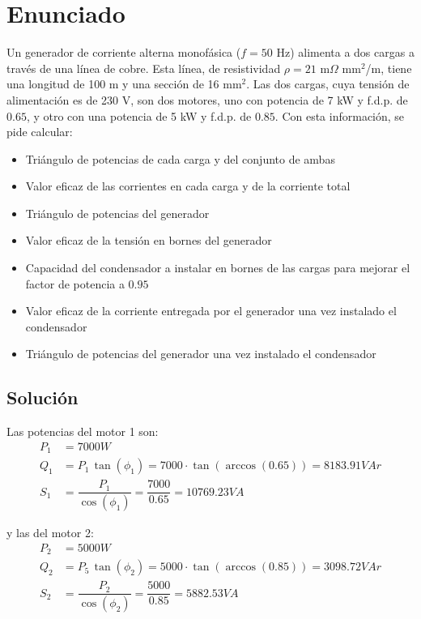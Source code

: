 
\section{Enunciado}
                                              
Un generador de corriente alterna monofásica ($f=50$ Hz) alimenta a dos
cargas a través de una línea de cobre. Esta línea, de resistividad
$\rho=21$ m$\Omega$ mm$^2$/m, tiene una longitud de 100 m y una sección
de 16 mm$^2$. Las dos cargas, cuya tensión de alimentación es de 230 V,
son dos motores, uno con potencia de 7 kW y f.d.p. de $0.65$, y otro con
una potencia de 5 kW y f.d.p. de $0.85$. Con esta información, se pide
calcular:
\begin{itemize}
\item Triángulo de potencias de cada carga y del conjunto de ambas
\item Valor eficaz de las corrientes en cada carga y de la corriente
  total
\item Triángulo de potencias del generador
\item Valor eficaz de la tensión en bornes del generador
\item Capacidad del condensador a instalar en bornes de las cargas para
  mejorar el factor de potencia a $0.95$
\item Valor eficaz de la corriente entregada por el generador una vez
  instalado el condensador
\item Triángulo de potencias del generador una vez instalado el
  condensador
\end{itemize}

\subsection*{Solución}

Las potencias del motor 1 son:
\begin{align*}
  P_1&=7000W\\ Q_1&=P_1\,\tan(\phi_1)=7000\cdot
                    \tan(\arccos(0.65))=8183.91VAr\\
  S_1&=\dfrac{P_1}{\cos(\phi_1)}=\dfrac{7000}{0.65}=10769.23VA
\end{align*}

y las del motor 2:
\begin{align*}
  P_2&=5000W\\ Q_2&=P_5\,\tan(\phi_2)=5000\cdot
                    \tan(\arccos(0.85))=3098.72VAr\\
  S_2&=\dfrac{P_2}{\cos(\phi_2)}=\dfrac{5000}{0.85}=5882.53VA
\end{align*}

